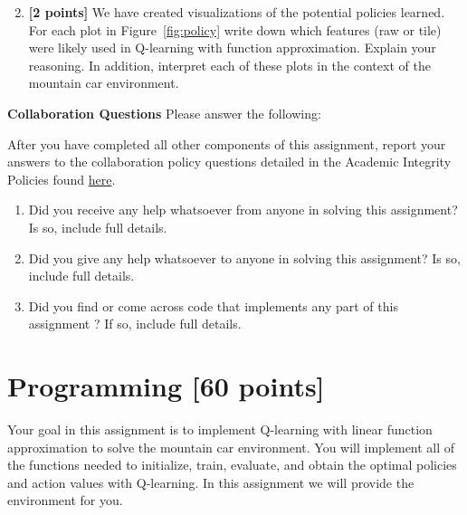 \documentclass[11pt]{article}
\numberwithin{equation}{section} %
\numberwithin{figure}{section} %
\numberwithin{table}{section} %
\newcommand{\points}[1]{{\bf [#1 points]}}
\begin{document}
\begin{enumerate}
\setcounter{enumi}{1}
\item \textbf{[2 points]} We have created visualizations of the potential policies learned. For each plot in Figure~\ref{fig:policy} write down which features (raw or tile) were likely used in Q-learning with function approximation. Explain your reasoning. In addition, interpret each of these plots in the context of the mountain car environment.
    
\begin{tcolorbox}[fit,height=4cm, width=\linewidth, blank, borderline={1pt}{-2pt},nobeforeafter]
\end{tcolorbox}

\end{enumerate}



\clearpage
\textbf{Collaboration Questions} Please answer the following:


    After you have completed all other components of this assignment, report your answers to the collaboration policy questions detailed in the Academic Integrity Policies found \href{http://www.cs.cmu.edu/~mgormley/courses/10601/about.html#7-academic-integrity-policies}{here}.
    \begin{enumerate}
        \item Did you receive any help whatsoever from anyone in solving this assignment? Is so, include full details.
        \item Did you give any help whatsoever to anyone in solving this assignment? Is so, include full details.
        \item Did you find or come across code that implements any part of this assignment ? If so, include full details.
    \end{enumerate}
    
\begin{tcolorbox}[fit,height=14cm, width=\linewidth, blank, borderline={1pt}{-2pt},nobeforeafter]
     
\end{tcolorbox}


\clearpage
\section{Programming \points{60}}
\label{sec:code}

Your goal in this assignment is to implement Q-learning with linear function approximation to solve the mountain car environment. You will implement all of the functions needed to initialize, train, evaluate, and obtain the optimal policies and action values with Q-learning. In this assignment we will provide the environment for you.
\end{document}
